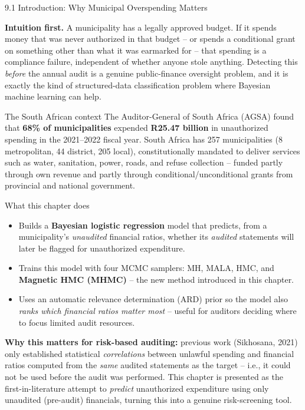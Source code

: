 \documentclass[aspectratio=169,10pt]{beamer}
\begin{document}
\begin{frame}[allowframebreaks]{9.1 Introduction: Why Municipal Overspending Matters}

\textbf{Intuition first.} A municipality has a legally approved budget. If it
spends money that was never authorized in that budget -- or spends a
conditional grant on something other than what it was earmarked for -- that
spending is a compliance failure, independent of whether anyone stole
anything. Detecting this \emph{before} the annual audit is a genuine
public-finance oversight problem, and it is exactly the kind of
structured-data classification problem where Bayesian machine learning can
help.

\begin{block}{The South African context}
The Auditor-General of South Africa (AGSA) found that \textbf{68\% of
municipalities} expended \textbf{R25.47 billion} in unauthorized spending in
the 2021--2022 fiscal year. South Africa has 257 municipalities (8
metropolitan, 44 district, 205 local), constitutionally mandated to deliver
services such as water, sanitation, power, roads, and refuse collection --
funded partly through own revenue and partly through conditional/unconditional
grants from provincial and national government.
\end{block}

\framebreak

\begin{block}{What this chapter does}
\begin{itemize}
  \item Builds a \textbf{Bayesian logistic regression} model that predicts,
  from a municipality's \emph{unaudited} financial ratios, whether its
  \emph{audited} statements will later be flagged for unauthorized
  expenditure.
  \item Trains this model with four MCMC samplers: MH, MALA, HMC, and
  \textbf{Magnetic HMC (MHMC)} -- the new method introduced in this chapter.
  \item Uses an automatic relevance determination (ARD) prior so the model
  also \emph{ranks which financial ratios matter most} -- useful for
  auditors deciding where to focus limited audit resources.
\end{itemize}
\end{block}

\textbf{Why this matters for risk-based auditing:} previous work
(Sikhosana, 2021) only established statistical \emph{correlations} between
unlawful spending and financial ratios computed from the \emph{same} audited
statements as the target -- i.e., it could not be used before the audit was
performed. This chapter is presented as the first-in-literature attempt to
\emph{predict} unauthorized expenditure using only unaudited (pre-audit)
financials, turning this into a genuine risk-screening tool.

\end{frame}
\end{document}
